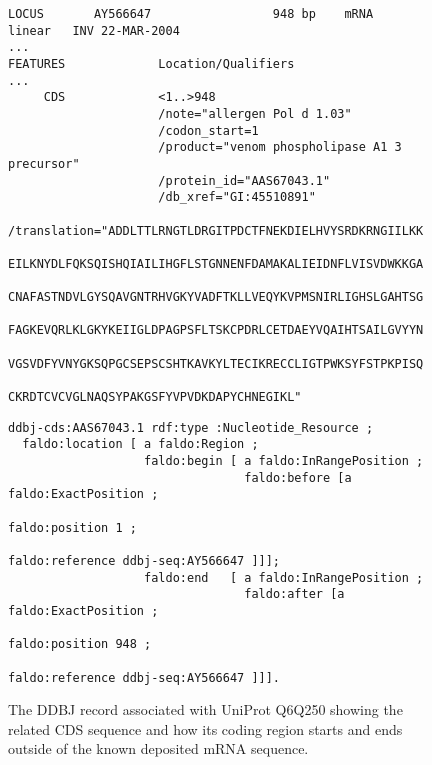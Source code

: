 \begin{figure}
\begin{shaded}
\small
\begin{verbatim}
LOCUS       AY566647                 948 bp    mRNA    linear   INV 22-MAR-2004
...
FEATURES             Location/Qualifiers
...
     CDS             <1..>948
                     /note="allergen Pol d 1.03"
                     /codon_start=1
                     /product="venom phospholipase A1 3 precursor"
                     /protein_id="AAS67043.1"
                     /db_xref="GI:45510891"
                     /translation="ADDLTTLRNGTLDRGITPDCTFNEKDIELHVYSRDKRNGIILKK
                     EILKNYDLFQKSQISHQIAILIHGFLSTGNNENFDAMAKALIEIDNFLVISVDWKKGA
                     CNAFASTNDVLGYSQAVGNTRHVGKYVADFTKLLVEQYKVPMSNIRLIGHSLGAHTSG
                     FAGKEVQRLKLGKYKEIIGLDPAGPSFLTSKCPDRLCETDAEYVQAIHTSAILGVYYN
                     VGSVDFYVNYGKSQPGCSEPSCSHTKAVKYLTECIKRECCLIGTPWKSYFSTPKPISQ
                     CKRDTCVCVGLNAQSYPAKGSFYVPVDKDAPYCHNEGIKL"
\end{verbatim}
\begin{verbatim}
ddbj-cds:AAS67043.1 rdf:type :Nucleotide_Resource ;
  faldo:location [ a faldo:Region ;
                   faldo:begin [ a faldo:InRangePosition ;
                                 faldo:before [a faldo:ExactPosition ;
                                              faldo:position 1 ;
                                              faldo:reference ddbj-seq:AY566647 ]]];
                   faldo:end   [ a faldo:InRangePosition ;
                                 faldo:after [a faldo:ExactPosition ;
                                              faldo:position 948 ;
                                              faldo:reference ddbj-seq:AY566647 ]]].
\end{verbatim}
\end{shaded}
\caption{The DDBJ record associated with UniProt Q6Q250 showing the related CDS sequence and how its coding region starts and ends outside of the known deposited mRNA sequence.}
\label{fig:DDBJ}
\end{figure}



